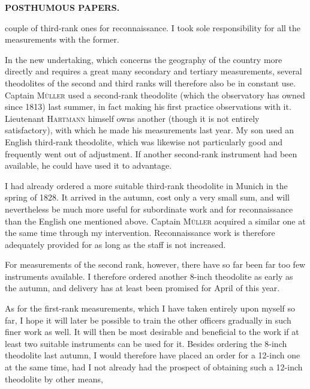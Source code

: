 \par\clearpage
\noindent{}\hfill{\small\textbf{POSTHUMOUS PAPERS.}}\hfill\null\par\medskip
\noindent couple of third-rank ones for reconnaissance. I took sole responsibility for all the measurements with the former.

\par\noindent\hspace*{\parindent}In the new undertaking, which concerns the geography of the country more directly and requires a great many secondary and tertiary measurements, several theodolites of the second and third ranks will therefore also be in constant use. Captain \textsc{Müller} used a second-rank theodolite (which the observatory has owned since 1813) last summer, in fact making his first practice observations with it. Lieutenant \textsc{Hartmann} himself owns another (though it is not entirely satisfactory), with which he made his measurements last year. My son used an English third-rank theodolite, which was likewise not particularly good and frequently went out of adjustment. If another second-rank instrument had been available, he could have used it to advantage.

\par\noindent\hspace*{\parindent}I had already ordered a more suitable third-rank theodolite in Munich in the spring of 1828. It arrived in the autumn, cost only a very small sum, and will nevertheless be much more useful for subordinate work and for reconnaissance than the English one mentioned above. Captain \textsc{Müller} acquired a similar one at the same time through my intervention. Reconnaissance work is therefore adequately provided for as long as the staff is not increased.

\par\noindent\hspace*{\parindent}For measurements of the second rank, however, there have so far been far too few instruments available. I therefore ordered another 8-inch theodolite as early as the autumn, and delivery has at least been promised for April of this year.

\par\noindent\hspace*{\parindent}As for the first-rank measurements, which I have taken entirely upon myself so far, I hope it will later be possible to train the other officers gradually in such finer work as well. It will then be most desirable and beneficial to the work if at least two suitable instruments can be used for it. Besides ordering the 8-inch theodolite last autumn, I would therefore have placed an order for a 12-inch one at the same time, had I not already had the prospect of obtaining such a 12-inch theodolite by other means,

